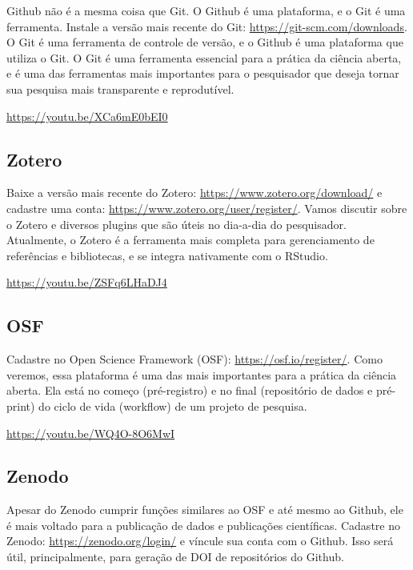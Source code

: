 \documentclass[
  a4paper,
]{article}
\begin{document}

Github não é a mesma coisa que Git. O Github é uma plataforma, e o Git é
uma ferramenta. Instale a versão mais recente do Git:
\url{https://git-scm.com/downloads}. O Git é uma ferramenta de controle
de versão, e o Github é uma plataforma que utiliza o Git. O Git é uma
ferramenta essencial para a prática da ciência aberta, e é uma das
ferramentas mais importantes para o pesquisador que deseja tornar sua
pesquisa mais transparente e reprodutível.

\url{https://youtu.be/XCa6mE0bEI0}

\subsection*{Zotero}\label{sec-zoteroprework}


Baixe a versão mais recente do Zotero:
\url{https://www.zotero.org/download/} e cadastre uma conta:
\url{https://www.zotero.org/user/register/}. Vamos discutir sobre o
Zotero e diversos plugins que são úteis no dia-a-dia do pesquisador.
Atualmente, o Zotero é a ferramenta mais completa para gerenciamento de
referências e bibliotecas, e se integra nativamente com o RStudio.

\url{https://youtu.be/ZSFq6LHaDJ4}

\subsection*{OSF}\label{sec-osfprework}


Cadastre no Open Science Framework (OSF):
\url{https://osf.io/register/}. Como veremos, essa plataforma é uma das
mais importantes para a prática da ciência aberta. Ela está no começo
(pré-registro) e no final (repositório de dados e pré-print) do ciclo de
vida (workflow) de um projeto de pesquisa.

\url{https://youtu.be/WQ4O-8O6MwI}

\subsection*{Zenodo}\label{sec-zenodoprework}


Apesar do Zenodo cumprir funções similares ao OSF e até mesmo ao Github,
ele é mais voltado para a publicação de dados e publicações científicas.
Cadastre no Zenodo: \url{https://zenodo.org/login/} e víncule sua conta
com o Github. Isso será útil, principalmente, para geração de DOI de
repositórios do Github.
\end{document}
